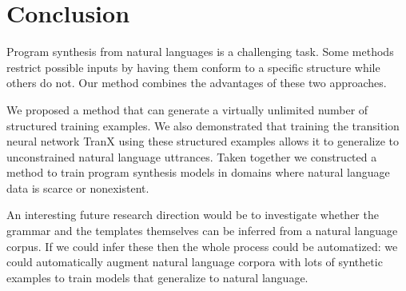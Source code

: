 \section{Conclusion}

Program synthesis from natural languages is a challenging task. Some methods
restrict possible inputs by having them conform to a specific structure while
others do not. Our method combines the advantages of these two approaches.

We proposed a method that can generate a virtually unlimited number of
structured training examples. We also demonstrated that training the transition
neural network TranX \cite{tranx} using these structured examples allows it to
generalize to unconstrained natural language uttrances. Taken together we
constructed a method to train program synthesis models in domains where natural
language data is scarce or nonexistent.

An interesting future research direction would be to investigate whether the
grammar and the templates themselves can be inferred from a natural language
corpus. If we could infer these then the whole process could be automatized: we
could automatically augment natural language corpora with lots of synthetic
examples to train models that generalize to natural language.